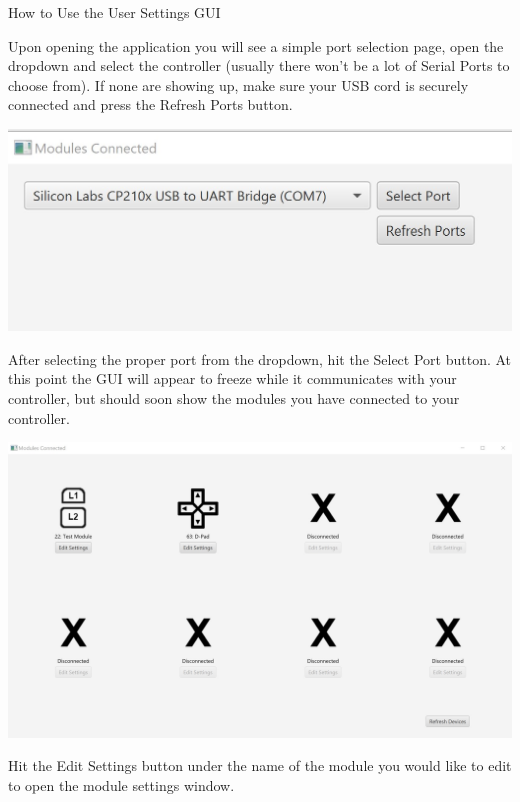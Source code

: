 \documentclass{article}
\begin{document}
\begin{center}
\Large{How to Use the User Settings GUI}
\end{center}

Upon opening the application you will see a simple port selection page, open the dropdown and select the controller (usually there won't be a lot of Serial Ports to choose from). If none are showing up, make sure your USB cord is securely connected and press the Refresh Ports button.

\begin{center}
\includegraphics{SelectPort}
\end{center}

After selecting the proper port from the dropdown, hit the Select Port button. At this point the GUI will appear to freeze while it communicates with your controller, but should soon show the modules you have connected to your controller.

\begin{center}
\includegraphics{ModulesPage}
\end{center}

Hit the Edit Settings button under the name of the module you would like to edit to open the module settings window.
\end{document}
